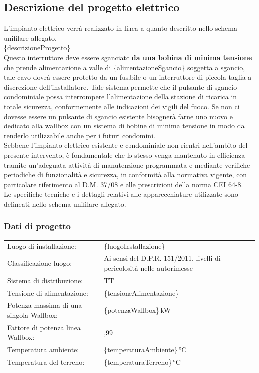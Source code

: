 \subsection{Descrizione del progetto elettrico}
L’impianto elettrico verrà realizzato in linea a quanto descritto nello schema unifilare allegato. \\
\{descrizioneProgetto\} \\
Questo interruttore deve essere sganciato \textbf{da una bobina di minima tensione} che prende alimentazione a valle di \{alimentazioneSgancio\} soggetta a sgancio, tale cavo dovrà essere protetto da un fusibile o un interruttore di piccola taglia a discrezione dell'installatore. Tale sistema permette che il pulsante di sgancio condominiale possa interrompere l'alimentazione della stazione di ricarica in totale sicurezza, conformemente alle indicazioni dei vigili del fuoco. Se non ci dovesse essere un pulsante di sgancio esistente bisognerà farne uno nuovo e dedicato alla wallbox con un sistema di bobine di minima tensione in modo da renderlo utilizzabile anche per i futuri condomini. \\
Sebbene l’impianto elettrico esistente e condominiale non rientri nell’ambito del presente intervento, è fondamentale che lo stesso venga mantenuto in efficienza tramite un’adeguata attività di manutenzione programmata e mediante verifiche periodiche di funzionalità e sicurezza, in conformità alla normativa vigente, con particolare riferimento al D.M. 37/08 e alle prescrizioni della norma CEI 64-8. \\
Le specifiche tecniche e i dettagli relativi alle apparecchiature utilizzate sono delineati nello schema unifilare allegato.

\subsubsection{Dati di progetto}
\begin{center}
\begin{tabularx}{\textwidth}{>{\raggedright\arraybackslash}p{} >{\raggedright\arraybackslash}X}
Luogo di installazione:              & \{luogoInstallazione\} \\
Classificazione luogo:               & Ai sensi del D.P.R. 151/2011, livelli di pericolosità nelle autorimesse \\
Sistema di distribuzione:            & TT \\
Tensione di alimentazione:           & \{tensioneAlimentazione\} \\
Potenza massima di una singola Wallbox: & \{potenzaWallbox\}\,kW \\
Fattore di potenza linea Wallbox:    & 0,99 \\
Temperatura ambiente:                & \{temperaturaAmbiente\}\,°C \\
Temperatura del terreno:             & \{temperaturaTerreno\}\,°C \\
\end{tabularx}
\end{center}

